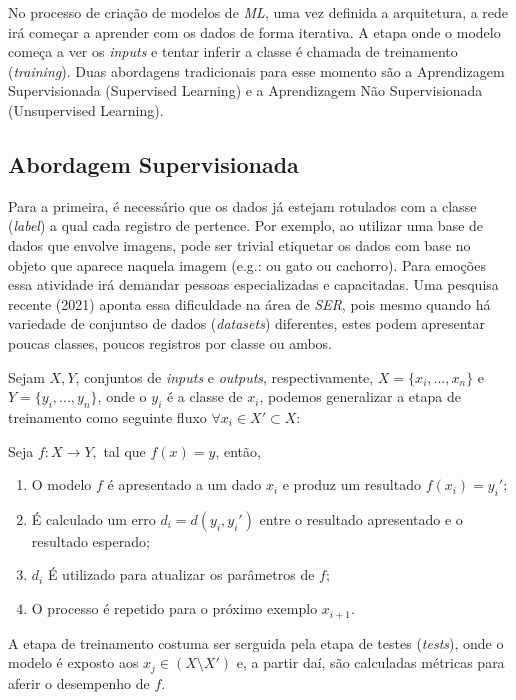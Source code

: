 No processo de criação de modelos de \textit{ML}, uma vez definida a arquitetura, a rede irá começar a aprender com os dados de forma iterativa. A etapa onde o modelo começa a ver os \textit{inputs} e tentar inferir a classe é chamada de treinamento (\textit{training}). Duas abordagens tradicionais para esse momento são a Aprendizagem Supervisionada (Supervised Learning) e a Aprendizagem Não Supervisionada (Unsupervised Learning).

\subsection{Abordagem Supervisionada}\label{supervisionada}

Para a primeira, é necessário que os dados já estejam rotulados com a classe (\textit{label}) a qual cada registro de pertence. Por exemplo, ao utilizar uma base de dados que envolve imagens, pode ser trivial etiquetar os dados com base no objeto que aparece naquela imagem (e.g.: ou gato ou cachorro). Para emoções essa atividade irá demandar pessoas especializadas e capacitadas. Uma pesquisa \cite{32} recente (2021) aponta essa dificuldade na área de \textit{SER}, pois mesmo quando há variedade de conjuntso de dados (\textit{datasets}) diferentes, estes podem apresentar poucas classes, poucos registros por classe ou ambos.

Sejam $X, Y$, conjuntos de \textit{inputs} e \textit{outputs}, respectivamente, $X=\{x_i, ..., x_n\}$ e $Y=\{y_i, ..., y_n\}$, onde o $y_i$ é a classe de $x_i$, podemos generalizar a etapa de treinamento como seguinte fluxo $\forall x_i \in X' \subset X$:

Seja $f: X \rightarrow Y,$ tal que $f(x) = y$, então,

\begin{enumerate}
    \item O modelo $f$ é apresentado a um dado $x_i$ e produz um resultado $f(x_i) = y_i'$;
    \item É calculado um erro $d_i = d(y_i, y_i')$ entre o resultado apresentado e o resultado esperado;
    \item $d_i$ É utilizado para atualizar os parâmetros de $f$;
    \item O processo é repetido para o próximo exemplo $x_{i+1}$.
\end{enumerate}

A etapa de treinamento costuma ser serguida pela etapa de testes (\textit{tests}), onde o modelo é exposto aos $x_j \in (X \setminus X')$ e, a partir daí, são calculadas métricas para aferir o desempenho de $f$.

